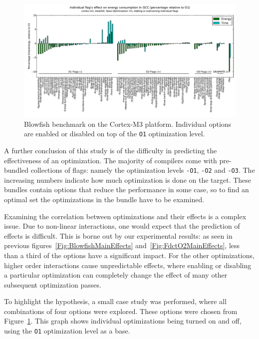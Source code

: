 \documentclass[twocolumn]{article}
\let\oldcaption\caption
\renewcommand{\caption}[1]{\oldcaption{\textup{#1}}}
\begin{document}
\begin{figure}[bt]
	\includegraphics[width=\linewidth,clip,trim=0.5cm 0 0cm 1.8cm]{cortex-m3/O1_addsub_blowfish.pdf}
	\caption{Blowfish benchmark on the Cortex-M3 platform. Individual options are enabled or disabled on top of the \texttt{O1} optimization level.}
	\label{Fig:AddsubO1Blowfish}
\end{figure}

A further conclusion of this study is of the difficulty in predicting the effectiveness of an optimization. The majority of compilers come with pre-bundled collections of flags: namely the optimization levels \texttt{-O1}, \texttt{-O2} and \texttt{-O3}. The increasing numbers indicate how much optimization is done on the target. These bundles contain options that reduce the performance in some case, so to find an optimal set the optimizations in the bundle have to be examined.

Examining the correlation between optimizations and their effects is a complex issue. Due to non-linear interactions, one would expect that the prediction of effects is difficult. This is borne out by our experimental results: as seen in previous figures~\ref{Fig:BlowfishMainEffects} and~\ref{Fig:FdctO2MainEffects}, less than a third of the options have a significant impact. For the other optimizations, higher order interactions cause unpredictable effects, where enabling or disabling a particular optimization can completely change the effect of many other subsequent optimization passes.

To highlight the hypothesis, a small case study was performed, where all combinations of four options were explored. These options were chosen from Figure~\ref{Fig:AddsubO1Blowfish}. This graph shows individual optimizations being turned on and off, using the \texttt{O1} optimization level as a base.
\end{document}
